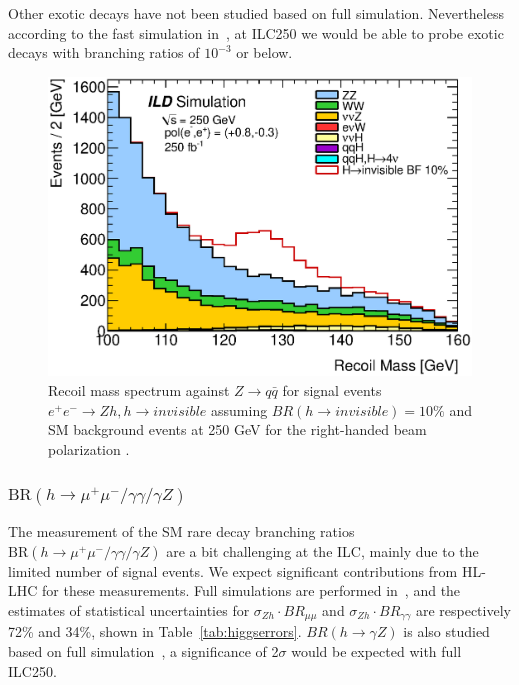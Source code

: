 Other exotic decays have not been studied based on full simulation. Nevertheless
according to the fast simulation in~\cite{Liu:2016zki}, at ILC250 we would be able 
to probe exotic decays with branching ratios of $10^{-3}$ or below.

\begin{figure}
\begin{center}
\includegraphics[width=0.85\hsize]{chapters/figures/ZH_qqinv250_right.eps}
\end{center}
  \caption{Recoil mass spectrum against
 $Z\to q\bar{q}$ for signal events $e^+e^-\to Zh, h\to invisible$ assuming $BR(h\to invisible)=10\%$
  and SM background events at 250 GeV for the right-handed beam polarization \cite{Ishikawa:2014}.}
  \label{fig:qqHinv250}
\end{figure}

\subsubsection{$\mathrm{BR}(h\to \mu^+\mu^- / \gamma\gamma / \gamma Z)$}
The measurement of the SM rare decay branching ratios
$\mathrm{BR}(h\to \mu^+\mu^- / \gamma\gamma / \gamma Z)$
are a bit challenging at the ILC, mainly due to the limited number of signal events. 
We expect significant contributions from HL-LHC for these measurements.
Full simulations are performed in~\cite{Kawada:2018wyz,Calancha:2013}, 
and the estimates of statistical uncertainties for
$\sigma_{Zh}\cdot BR_{\mu\mu}$ and $\sigma_{Zh}\cdot BR_{\gamma\gamma}$
are respectively 72\% and 34\%, shown in Table~\ref{tab:higgserrors}. 
$BR(h\to\gamma Z)$ is also studied based on full simulation~\cite{Fujii:2018}, 
a significance of 2$\sigma$ would be expected with full ILC250.

